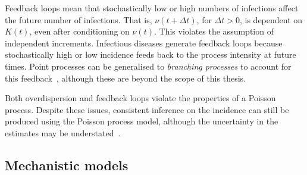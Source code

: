 \documentclass[thesis.tex]{subfiles}
\begin{document}
Feedback loops mean that stochastically low or high numbers of infections affect the future number of infections.
That is, $\nu(t+\Delta t)$, for $\Delta t > 0$, is dependent on $K(t)$, even after conditioning on $\nu(t)$.
This violates the assumption of independent increments.
Infectious diseases generate feedback loops because stochastically high or low incidence feeds back to the process intensity at future times.
Point processes can be generalised to \emph{branching processes} to account for this feedback~\autocite[246]{yanDistribution}, although these are beyond the scope of this thesis.

Both overdispersion and feedback loops violate the properties of a Poisson process.
Despite these issues, consistent inference on the incidence can still be produced using the Poisson process model, although the uncertainty in the estimates may be understated~\autocite{beckerDependent}.








\subsection{Mechanistic models} \label{SEIR:sec:mechanistic-models}
\end{document}
